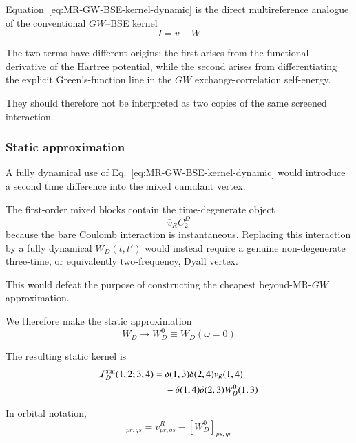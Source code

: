 \documentclass[aip,jcp,reprint,noshowkeys,superscriptaddress]{revtex4-1}
\begin{document}
Equation~\eqref{eq:MR-GW-BSE-kernel-dynamic} is the direct
multireference analogue of the conventional $GW$--BSE kernel
\begin{equation}
  I=v-W
\end{equation}

The two terms have different origins: the first arises from the
functional derivative of the Hartree potential, while the second
arises from differentiating the explicit Green's-function line in the
$GW$ exchange-correlation self-energy.

They should therefore not be interpreted as two copies of the same
screened interaction.


\subsubsection{Static approximation}

A fully dynamical use of
Eq.~\eqref{eq:MR-GW-BSE-kernel-dynamic} would introduce a second time
difference into the mixed cumulant vertex.

The first-order mixed blocks contain the time-degenerate object
\begin{equation}
  \bar v_R C_2^D
\end{equation}
because the bare Coulomb interaction is instantaneous.  Replacing this
interaction by a fully dynamical $W_D(t,t')$ would instead require a
genuine non-degenerate three-time, or equivalently two-frequency,
Dyall vertex.

This would defeat the purpose of constructing the cheapest
beyond-MR-$GW$ approximation.

We therefore make the static approximation
\begin{equation}
  W_D
  \longrightarrow
  W_D^0
  \equiv
  W_D(\omega=0)
  \label{eq:static-WD}
\end{equation}

The resulting static kernel is
\begin{equation}
  \begin{aligned}
  \mathcal I_D^{\rm stat}(1,2;3,4)
  ={}&
  \delta(1,3)\delta(2,4)
  v_R(1,4)
  \\
  &-
  \delta(1,4)\delta(2,3)
  W_D^0(1,3)
  \end{aligned}
  \label{eq:static-MR-kernel}
\end{equation}

In orbital notation,
\begin{equation}
  [\mathcal I_D^{\rm stat}]_{pr,qs}
  =
  v^R_{pr,qs}
  -
  [W_D^0]_{ps,qr}
  \label{eq:static-MR-kernel-orbital}
\end{equation}
\end{document}
